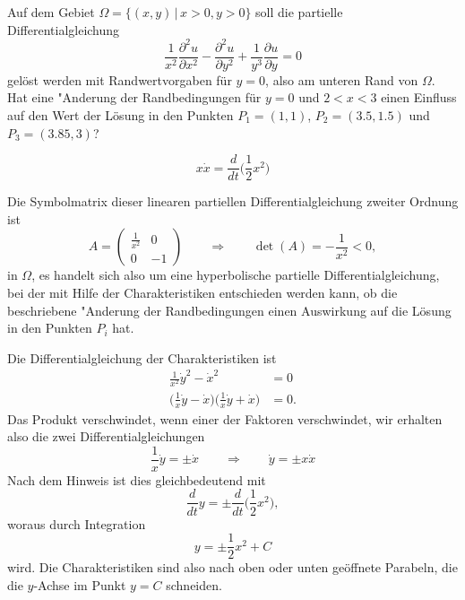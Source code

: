 Auf dem Gebiet $\Omega = \{(x,y)\,|\, x>0,y>0\}$ soll die partielle
Differentialgleichung
\begin{equation}
\frac1{x^2}\frac{\partial^2u}{\partial x^2}
-\frac{\partial^2 u}{\partial y^2}+\frac1{y^3}\frac{\partial u}{\partial y}=0
\label{90000012:equation}
\end{equation}
gelöst werden mit Randwertvorgaben für $y=0$, also am unteren Rand von
$\Omega$.
Hat eine "Anderung der Randbedingungen für $y=0$ und $2<x<3$ einen Einfluss
auf den Wert der Lösung in den Punkten 
$P_1=(1,1)$, $P_2=(3.5,1.5)$ und $P_3=(3.85,3)$?

\begin{hinweis}
\[
x\dot x=\frac{d}{dt}\bigl(
{\textstyle \frac12}x^2
\bigr)
\]
\end{hinweis}

\begin{loesung}
Die Symbolmatrix dieser linearen partiellen Differentialgleichung zweiter
Ordnung ist
\[
A=\begin{pmatrix}
\frac1{x^2}&0\\0&-1
\end{pmatrix}
\qquad
\Rightarrow
\qquad
\det(A)=-\frac1{x^2}<0,
\]
in $\Omega$, es handelt sich also um eine hyperbolische partielle 
Differentialgleichung, bei der mit Hilfe der Charakteristiken
entschieden werden kann, ob die beschriebene "Anderung der Randbedingungen
einen Auswirkung auf die Lösung in den Punkten $P_i$ hat.

Die Differentialgleichung der Charakteristiken ist
\begin{align*}
\frac1{x^2}\dot y^2-\dot x^2&=0
\\
\biggl(\frac1x \dot y-\dot x\biggr)
\biggl(\frac1x \dot y+\dot x\biggr)
&=0.
\end{align*}
Das Produkt verschwindet, wenn einer der Faktoren verschwindet, wir erhalten
also die zwei Differentialgleichungen
\[
\frac1x\dot y=\pm\dot x
\qquad
\Rightarrow
\qquad
\dot y=\pm x\dot x
\]
Nach dem Hinweis ist dies gleichbedeutend mit
\[
\frac{d}{dt}y
=
\pm
\frac{d}{dt}
\biggl(
\frac12
x^2
\biggr),
\]
woraus durch Integration 
\[
y=\pm\frac12x^2+C
\]
wird.
Die Charakteristiken sind also nach oben oder unten geöffnete Parabeln,
die die $y$-Achse im Punkt $y=C$ schneiden.


\end{loesung}
